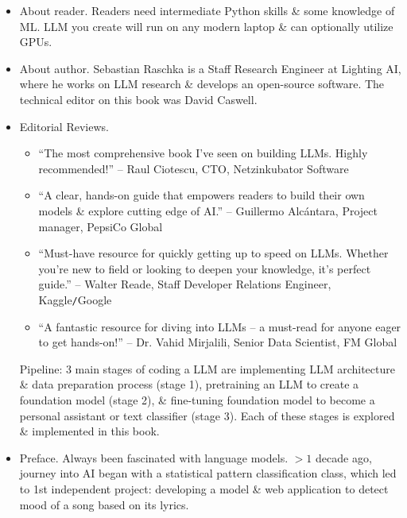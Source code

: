 \documentclass{article}
\begin{document}
\begin{itemize}
	{\bf What's inside.}
	\begin{itemize}
		\item Plan \& code an LLM comparable to GPT-2
		\item Load pretrained weights
		\item Construct a complete training pipeline
		\item Fine-tune your LLM for text classification
		\item Develop LLMs that follow human instructions
	\end{itemize}
	\item {\sf About reader.} Readers need intermediate Python skills \& some knowledge of ML. LLM you create will run on any modern laptop \& can optionally utilize GPUs.
	\item {\sf About author.} {\sc Sebastian Raschka} is a Staff Research Engineer at Lighting AI, where he works on LLM research \& develops an open-source software. The technical editor on this book was  {\sc David Caswell}.
	\item {\sf Editorial Reviews.}
	\begin{itemize}
		\item ``The most comprehensive book I've seen on building LLMs. Highly recommended!'' -- {\sc Raul Ciotescu}, CTO, Netzinkubator Software
		\item ``A clear, hands-on guide that empowers readers to build their own models \& explore cutting edge of AI.'' -- {\sc Guillermo Alcántara}, Project manager, PepsiCo Global
		\item ``Must-have resource for quickly getting up to speed on LLMs. Whether you're new to field or looking to deepen your knowledge, it's perfect guide.'' -- {\sc Walter Reade},  Staff Developer Relations Engineer, Kaggle{\tt/}Google
		\item ``A fantastic resource for diving into LLMs -- a must-read for anyone eager to get hands-on!'' -- Dr. {\sc Vahid Mirjalili}, Senior Data Scientist, FM Global
	\end{itemize}
	{\sf Pipeline: 3 main stages of coding a LLM are implementing LLM architecture \& data preparation process (stage 1), pretraining an LLM to create a foundation model (stage 2), \& fine-tuning foundation model to become a personal assistant or text classifier (stage 3). Each of these stages is explored \& implemented in this book.}
	\item {\sf Preface.} Always been fascinated with language models. $> 1$ decade ago, journey into AI began with a statistical pattern classification class, which led to 1st independent project: developing a model \& web application to detect mood of a song based on its lyrics.
	

\end{itemize}
\end{document}
